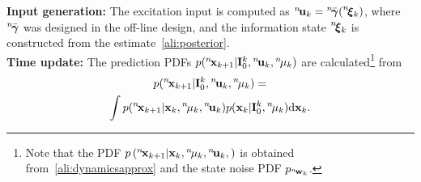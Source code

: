 \documentclass[conference,10pt]{IEEEtran}
\def\nth{\prescript{n\!}{}}
\begin{document}
\textbf{Input generation:} The excitation input is computed as $\nth{\bfu}_{k}=\nth{\bar{\bfgamma}}(\nth{\bfxi}_k)$, where $\nth{\bar{\bfgamma}}$ was designed in the off-line design, and the information state $\nth{\bfxi}_k$ is constructed from the estimate~\eqref{ali:posterior}.\\
\textbf{Time update:} The prediction PDFs $p(\nth{\bfx}_{k+1}\vert \bfI^{k}_{0},\nth{\bfu}_{k},\nth{\mu}_{k} )$  are calculated\footnote{Note that the PDF $p \left(\nth{\bfx}_{k+1} \vert \bfx_{k},\nth{\mu}_{k},\nth{\bfu}_{k},\right)$ is obtained from~\eqref{ali:dynamicsapprox} and the state noise PDF $p_{\nth{\bfw}_k}$.} from 
\begin{multline*}
	p(\nth{\bfx}_{k+1} \vert \bfI^{k}_{0}, \nth{\bfu}_{k},\nth{\mu}_{k}) =\\
	\int  p (\nth{\bfx}_{k+1} \vert \bfx_{k}, \nth{\mu}_{k}, \nth{\bfu}_{k} ) p(\bfx_{k} \vert\bfI^{k}_{0},\nth{\mu}_{k})\mathrm{d}\bfx_{k}.
\end{multline*}
\end{document}
